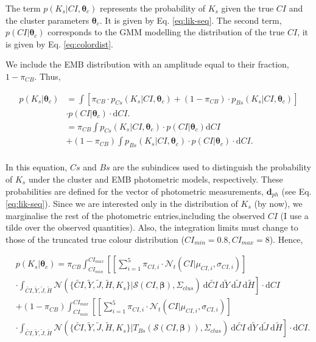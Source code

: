 The term $p(K_s | CI ,\boldsymbol{\theta}_c)$ represents the probability of $K_s$ given the true $CI$ and the cluster parameters $\boldsymbol{\theta}_c$. It is given by Eq. \ref{eq:lik-seq}. The second term, $p(CI|\boldsymbol{\theta}_c)$ corresponds to the GMM modelling the distribution of the true $CI$, it is given by Eq. \ref{eq:colordist}. 

We include the EMB  distribution with an amplitude equal to their fraction, $1-\pi_{CB}$. Thus,

\begin{align}
p(K_s | \boldsymbol{\theta}_c) & =  \int \left[\pi_{CB}\cdot p_{Cs}(K_s| CI, \boldsymbol{\theta}_c) + (1-\pi_{CB})\cdot p_{Bs}(K_s| CI, \boldsymbol{\theta}_c)\right]\nonumber \\& \cdot p(CI|\boldsymbol{\theta}_c)\cdot \mathrm{d}CI. \nonumber \\
& =   \pi_{CB} \int p_{Cs}(K_s| CI, \boldsymbol{\theta}_c) \cdot p(CI|\boldsymbol{\theta}_c) \mathrm{d}CI \nonumber \\
&+ (1-\pi_{CB})\int p_{Bs}(K_s| CI, \boldsymbol{\theta}_c) \cdot p(CI|\boldsymbol{\theta}_c)\cdot  \mathrm{d}CI. \nonumber \\
\end{align}

In this equation, $Cs$ and $Bs$ are the subindices used to distinguish the probability of $K_s$ under the cluster and EMB photometric models, respectively. These probabilities are defined for the vector of photometric measurements, $\boldsymbol{d}_{ph}$ (see Eq. \ref{eq:lik-seq}). Since we are interested only in the distribution of $K_s$ (by now), we marginalise the rest of the photometric entries,including the observed $CI$ (I use a tilde over the observed quantities). Also, the integration limits must change to those of the truncated true colour distribution ($CI_{min}=0.8, CI_{max}=8$). Hence,

\begin{align}
&p(K_s | \boldsymbol{\theta}_c)  =   \pi_{CB} \int_{CI_{min}}^{CI_{max}}\left[ \left[\sum_{i=1}^5 \pi_{CI,i} \cdot \mathcal{N}_t(CI| \mu_{CI,i},\sigma_{CI,i})\right]\right. \nonumber \\
&\cdot  \left.\int_{\tilde{CI},\tilde{Y},\tilde{J},\tilde{H}}\mathcal{N}(\{\tilde{CI},\tilde{Y},\tilde{J},\tilde{H},K_s\}|\boldsymbol{\mathcal{S}}(CI, \boldsymbol{\beta}),\Sigma_{clus})~\mathrm{d}\tilde{CI}~\mathrm{d}\tilde{Y}~\mathrm{d}\tilde{J}~\mathrm{d}\tilde{H}\right] \cdot \mathrm{d}CI \nonumber \\
& + (1-\pi_{CB}) \int_{CI_{min}}^{CI_{max}}\left[\left[\sum_{i=1}^5 \pi_{CI,i} \cdot \mathcal{N}_t(CI| \mu_{CI,i},\sigma_{CI,i})\right]\right.\nonumber\\
&\cdot \left. \int_{\tilde{CI},\tilde{Y},\tilde{J},\tilde{H}}\mathcal{N}(\{\tilde{CI},\tilde{Y},\tilde{J},\tilde{H},K_s\}|T_{Bs}(\boldsymbol{\mathcal{S}}(CI, \boldsymbol{\beta})),\Sigma_{clus})~\mathrm{d}\tilde{CI}~\mathrm{d}\tilde{Y}~\mathrm{d}\tilde{J}~\mathrm{d}\tilde{H}\right]\cdot \mathrm{d}CI. \nonumber 
\end{align}

